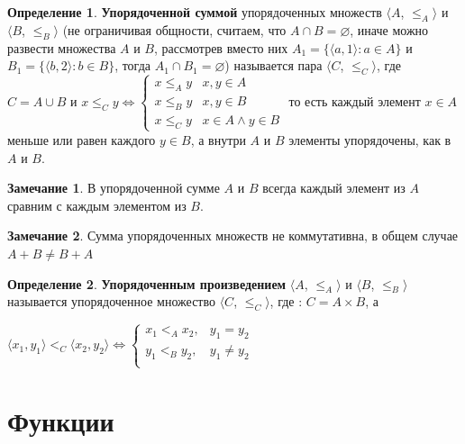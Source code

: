 \documentclass[12pt,oneside]{article}
\theoremstyle{definition}
\newtheorem{definition}{Определение}
\newtheorem{remark}{Замечание}[section]
\begin{document}
\begin{definition}
\textbf{Упорядоченной суммой} упорядоченных множеств $\langle A$, $\leqslant_A \rangle$ и $\langle B$, $\leqslant_B \rangle$ (не ограничивая общности, считаем, что $A\cap B = \varnothing$, иначе можно развести множества $A$ и $B$, рассмотрев вместо них $A_1 = \{\langle a, 1\rangle : a\in A\}$ и $B_1 = \{\langle b, 2\rangle : b\in B\}$, тогда $A_1 \cap B_1 = \varnothing$) называется пара $\langle C$, $ \leqslant _C\rangle$, где $C = A\cup B$ и
\newline
$x \leqslant _C y \Leftrightarrow
        \begin{cases}
        x \leqslant _A y & x,y\in A \\
        x \leqslant _B y & x,y\in B \\
        x \leqslant _C y & x\in A \wedge y\in B
        \end{cases}$
\newline
то есть каждый элемент $x\in A$ меньше или равен каждого $y\in B$, а внутри $A$ и $B$ элементы упорядочены, как в $A$ и $B$.
\end{definition}

\begin{remark}
В упорядоченной сумме $A$ и $B$ всегда каждый элемент из $A$ сравним с каждым элементом из $B$.
\end{remark}
\begin{remark} Сумма упорядоченных множеств не коммутативна, в общем случае $A+B\neq B+A$
\end{remark} 

\begin{definition}
\textbf{Упорядоченным произведением} $\langle A$, $\leqslant _A \rangle$ и $\langle B$, $\leqslant _B \rangle$ называется упорядоченное множество $\langle C$, $ \leqslant _C\rangle$, где :
\newline
$C = A\times B$, а

$\langle x_1, y_1\rangle <_C \langle x_2, y_2\rangle \Leftrightarrow 
        \begin{cases}
        x_1 <_A x_2, & y_1 = y_2\\
        y_1 <_B y_2, & y_1 \neq y_2\\
        \end{cases}$

\end{definition}

\section{Функции}
\end{document}
